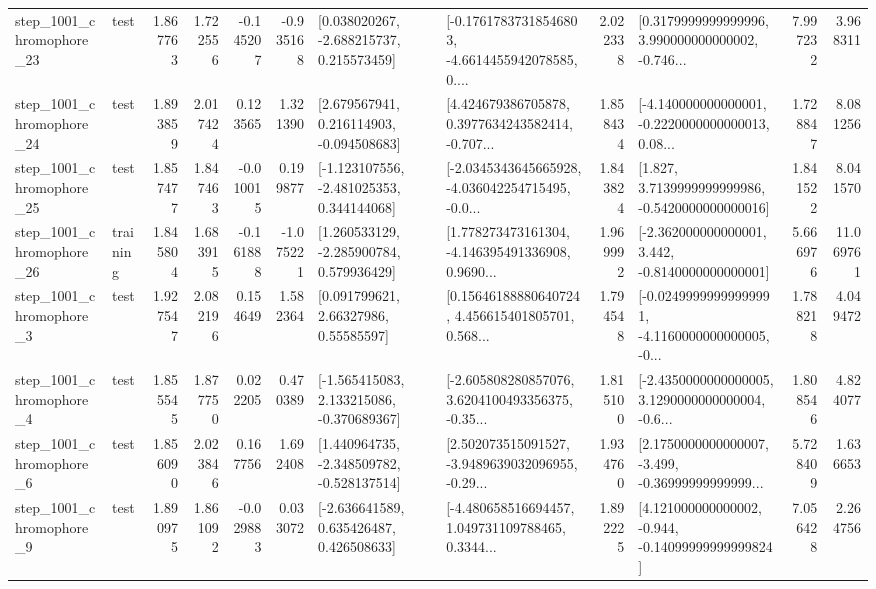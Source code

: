 \begin{tabular}{llrrrrllrlrr}
 step\_1001\_chromophore\_23 &      test &      1.867763 &    1.722556 &     -0.145207 & -0.935168 &    [0.038020267, -2.688215737, 0.215573459] &  [-0.17617837318546803, -4.6614455942078585, 0.... &       2.022338 &  [0.3179999999999996, 3.990000000000002, -0.746... &            7.997232 &          3.968311 \\
 step\_1001\_chromophore\_24 &      test &      1.893859 &    2.017424 &      0.123565 &  1.321390 &    [2.679567941, 0.216114903, -0.094508683] &  [4.424679386705878, 0.3977634243582414, -0.707... &       1.858434 &  [-4.140000000000001, -0.2220000000000013, 0.08... &            1.728847 &          8.081256 \\
 step\_1001\_chromophore\_25 &      test &      1.857477 &    1.847463 &     -0.010015 &  0.199877 &   [-1.123107556, -2.481025353, 0.344144068] &  [-2.0345343645665928, -4.036042254715495, -0.0... &       1.843824 &   [1.827, 3.7139999999999986, -0.5420000000000016] &            1.841522 &          8.041570 \\
 step\_1001\_chromophore\_26 &  training &      1.845804 &    1.683915 &     -0.161888 & -1.075221 &    [1.260533129, -2.285900784, 0.579936429] &  [1.778273473161304, -4.146395491336908, 0.9690... &       1.969992 &   [-2.362000000000001, 3.442, -0.8140000000000001] &            5.666976 &         11.069761 \\
  step\_1001\_chromophore\_3 &      test &      1.927547 &    2.082196 &      0.154649 &  1.582364 &       [0.091799621, 2.66327986, 0.55585597] &  [0.15646188880640724, 4.456615401805701, 0.568... &       1.794548 &  [-0.02499999999999991, -4.1160000000000005, -0... &            1.788218 &          4.049472 \\
  step\_1001\_chromophore\_4 &      test &      1.855545 &    1.877750 &      0.022205 &  0.470389 &   [-1.565415083, 2.133215086, -0.370689367] &  [-2.605808280857076, 3.6204100493356375, -0.35... &       1.815100 &  [-2.4350000000000005, 3.1290000000000004, -0.6... &            1.808546 &          4.824077 \\
  step\_1001\_chromophore\_6 &      test &      1.856090 &    2.023846 &      0.167756 &  1.692408 &   [1.440964735, -2.348509782, -0.528137514] &  [2.502073515091527, -3.9489639032096955, -0.29... &       1.934760 &  [2.1750000000000007, -3.499, -0.36999999999999... &            5.728409 &          1.636653 \\
  step\_1001\_chromophore\_9 &      test &      1.890975 &    1.861092 &     -0.029883 &  0.033072 &    [-2.636641589, 0.635426487, 0.426508633] &  [-4.480658516694457, 1.049731109788465, 0.3344... &       1.892225 &  [4.121000000000002, -0.944, -0.14099999999999824] &            7.056428 &          2.264756 \\

\end{tabular}
